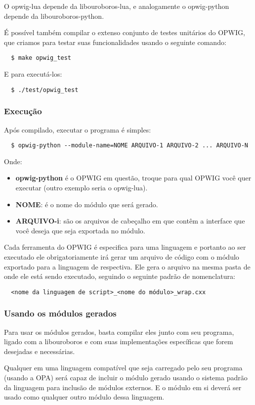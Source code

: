 O opwig-lua depende da libouroboros-lua, e analogamente o opwig-python depende da libouroboros-python.

É possível também compilar o extenso conjunto de testes unitários do OPWIG, que
criamos para testar suas funcionalidades usando o seguinte comando:
\begin{verbatim}
  $ make opwig_test
\end{verbatim}
E para executá-los:
\begin{verbatim}
  $ ./test/opwig_test
\end{verbatim}

\subsubsection{Execução}
Após compilado, executar o programa é simples:
\begin{verbatim}
  $ opwig-python --module-name=NOME ARQUIVO-1 ARQUIVO-2 ... ARQUIVO-N
\end{verbatim}
Onde:
\begin{itemize}
  \item \textbf{opwig-python} é o OPWIG em questão, troque para qual OPWIG você quer executar 
    (outro exemplo seria o opwig-lua).
  \item \textbf{NOME}: é o nome do módulo que será gerado.
  \item \textbf{ARQUIVO-i}: são os arquivos de cabeçalho em \CXX{} que contêm a interface
    que você deseja que seja exportada no módulo.
\end{itemize}

Cada ferramenta do OPWIG é especifica para uma linguagem e portanto ao ser executado
ele obrigatoriamente irá gerar um arquivo de código com o módulo exportado para a
linguagem de \script{} respectiva. Ele gera o arquivo na mesma pasta de onde ele está 
sendo executado, seguindo o seguinte padrão de nomenclatura:
\begin{verbatim}
  <nome da linguagem de script>_<nome do módulo>_wrap.cxx
\end{verbatim}

\subsubsection{Usando os módulos gerados}
Para usar os módulos gerados, basta compilar eles junto com seu programa, ligado com
a libouroboros e com suas implementações específicas que forem desejadas e
necessárias.

Qualquer \script{} em uma linguagem compatível que seja carregado pelo seu programa
(usando a OPA) será capaz de incluir o módulo gerado usando o sistema padrão da
linguagem para inclusão de módulos externos. E o módulo em si deverá ser
usado como qualquer outro módulo dessa linguagem.
